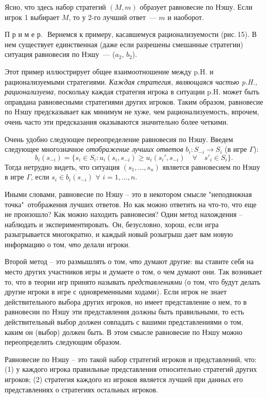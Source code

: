 \documentclass[12pt]{article}
\begin{document}
{Ясно, что здесь набор стратегий $(M,m)$ образует равновесие по Нэшу.
Если игрок 1 выбирает $M$, то у 2-го лучший ответ~--- $m$ и
наоборот.
\smallskip

П р и м е р.\,\, Вернемся к примеру, касавшемуся рационализуемости
(рис.\,15).  В нем существует единственная (даже если разрешены
смешанные стратегии) ситуация равновесия по Нэшу~--- ($a_2$, $b_2$).

Этот пример иллюстрирует общее взаимоотношение между p.H. и
рационализуемыми стратегиями. {\it Каждая стратегия, являющаяся
частью p.H., рационализуема}, поскольку каждая стратегия игрока в
ситуации p.H. может быть оправдана равновесными стратегиями других
игроков.  Таким образом, равновесие по Нэшу предсказывает как
минимум не хуже, чем рационализуемость, впрочем, очень часто эти
предсказания оказываются значительно более четкими.

Очень удобно следующее переопределение равновесия по Нэшу. Введем
следующее многозначное \emph{отображение лучших ответов} $b_i:S_{-i}\to
S_i$ (в игре $\Gamma$):
$$
b_i(s_{-i})=\{s_i\in S_i:u_i(s_i,s_{-i})\ge
u_i(s_i',s_{-i})\quad\forall\quad s'_i\in S_i\}.
$$
Тогда нетрудно видеть, что ситуация $(s_1,\ldots,s_n)$ является
равновесием по Нэшу в игре $\Gamma$, если $s_i\in b_i(s_{-i})$
$\forall \,\, i=1,\ldots,n$.

Иными словами, равновесие по Нэшу -- это в некотором смысле
"неподвижная точка"\, отображения лучших ответов. Но как можно
ответить на что-то, что еще не произошло? Как можно находить
равновесия? Один метод нахождения -- наблюдать и экспериментировать.
Он, безусловно, хорош, если игра разыгрывается многократно, и каждый
новый розыгрыш дает вам новую информацию о том, \emph{что} делали игроки.

Второй метод -- это размышлять о том, \emph{что} думают другие: вы
ставите себя на место других участников игры и думаете о том, о чем
думают они. Так возникает то, что в теории игр принято называть
\emph{представлениями} (о том, что будут делать другие игроки в игре
с одновременными ходами). Если игрок не знает действительного выбора
других игроков, но имеет представление о нем, то в равновесии по
Нэшу эти представления должны быть правильными, то есть
действительный выбор должен совпадать с вашими представлениями о
том, каким он (выбор) должен быть. В этом смысле равновесие по Нэшу
можно переопределить следующим образом.

Равновесие по Нэшу -- это такой набор стратегий игроков и
представлений, что: (1) у каждого игрока правильные представления
относительно стратегий других игроков; (2) стратегия каждого из
игроков является лучшей при данных его представлениях о стратегиях
остальных игроков.

}
\end{document}
